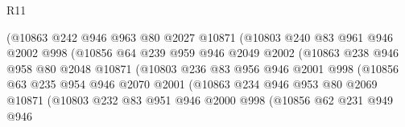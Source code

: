 \begin{lexlean}{R11}
\begin{coremodule}
                            (@10863
                              @242
                              @946
                              @963
                              @80
                              @2027
                              @10871
                              (@10803
                                @240
                                @83
                                @961
                                @946
                                @2002
                                @998
                                (@10856
                                  @64
                                  @239
                                  @959
                                  @946
                                  @2049
                                  @2002
                                  (@10863
                                    @238
                                    @946
                                    @958
                                    @80
                                    @2048
                                    @10871
                                    (@10803
                                      @236
                                      @83
                                      @956
                                      @946
                                      @2001
                                      @998
                                      (@10856
                                        @63
                                        @235
                                        @954
                                        @946
                                        @2070
                                        @2001
                                        (@10863
                                          @234
                                          @946
                                          @953
                                          @80
                                          @2069
                                          @10871
                                          (@10803
                                            @232
                                            @83
                                            @951
                                            @946
                                            @2000
                                            @998
                                            (@10856
                                              @62
                                              @231
                                              @949
                                              @946

\end{coremodule}
\end{lexlean}
